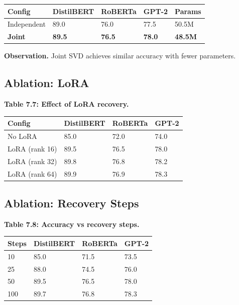 \begin{table}[H]
\centering
\small
\begin{tabular}{lllll}
\toprule
\textbf{Config} & \textbf{DistilBERT} & \textbf{RoBERTa} & \textbf{GPT-2} & \textbf{Params} \\
\midrule
Independent & 89.0 & 76.0 & 77.5 & 50.5M \\
\textbf{Joint} & \textbf{89.5} & \textbf{76.5} & \textbf{78.0} & \textbf{48.5M} \\
\bottomrule
\end{tabular}
\end{table}

\textbf{Observation.} Joint SVD achieves similar accuracy with fewer parameters.

\subsection{Ablation: LoRA}

\textbf{Table 7.7: Effect of LoRA recovery.}

\begin{table}[H]
\centering
\small
\begin{tabular}{llll}
\toprule
\textbf{Config} & \textbf{DistilBERT} & \textbf{RoBERTa} & \textbf{GPT-2} \\
\midrule
No LoRA & 85.0 & 72.0 & 74.0 \\
LoRA (rank 16) & 89.5 & 76.5 & 78.0 \\
LoRA (rank 32) & 89.8 & 76.8 & 78.2 \\
LoRA (rank 64) & 89.9 & 76.9 & 78.3 \\
\bottomrule
\end{tabular}
\end{table}

\subsection{Ablation: Recovery Steps}

\textbf{Table 7.8: Accuracy vs recovery steps.}

\begin{table}[H]
\centering
\small
\begin{tabular}{llll}
\toprule
\textbf{Steps} & \textbf{DistilBERT} & \textbf{RoBERTa} & \textbf{GPT-2} \\
\midrule
10 & 85.0 & 71.5 & 73.5 \\
25 & 88.0 & 74.5 & 76.0 \\
50 & 89.5 & 76.5 & 78.0 \\
100 & 89.7 & 76.8 & 78.3 \\
\bottomrule
\end{tabular}
\end{table}

